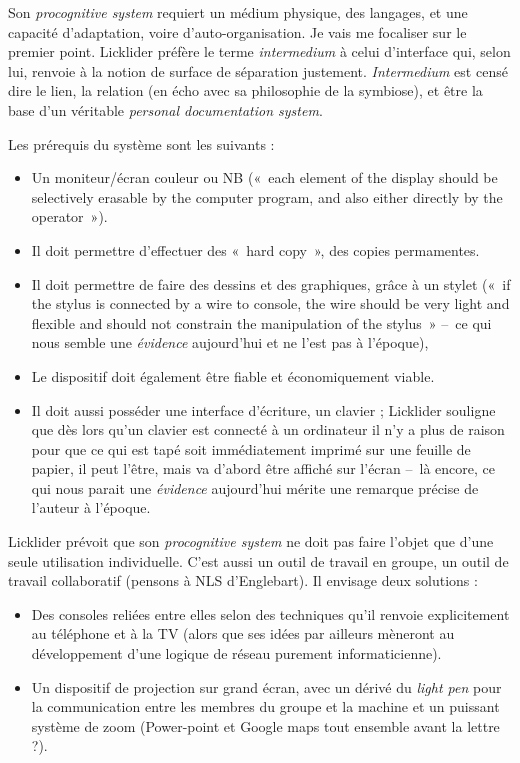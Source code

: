 \documentclass{FramateX}
\begin{document}
\begin{refsection}
Son \textit{procognitive system} requiert un médium physique, des langages, et
une capacité d'adaptation, voire d'auto-organisation. Je vais me
focaliser sur le premier point. Licklider préfère le terme
\textit{intermedium} à celui d'interface qui, selon lui, renvoie à la notion
de surface de séparation justement. \textit{Intermedium} est censé dire le lien,
la relation (en écho avec sa philosophie de la symbiose), et être la
base d'un véritable \textit{personal documentation system}.


Les prérequis du système sont les suivants :

\begin{itemize}
\item Un moniteur/écran couleur ou NB («~each element of the display
should be selectively erasable by the computer program, and also either
directly by the operator~»).
\item Il doit permettre d'effectuer des «~hard copy~», des copies
permamentes.
\item Il doit permettre de faire des dessins et des graphiques, grâce à
un stylet («~if the stylus is connected by a wire to console, the wire
should be very light and flexible and should not constrain the
manipulation of the stylus~» --~ce qui nous semble une \textit{évidence}
aujourd'hui et ne l'est pas à l'époque),
\item Le dispositif doit également être fiable et économiquement viable.
\item Il doit aussi posséder une interface d'écriture, un clavier ; Licklider souligne que dès lors qu'un clavier est connecté à un
ordinateur il n'y a plus de raison pour que ce qui est tapé soit
immédiatement imprimé sur une feuille de papier, il peut l'être, mais
va d'abord être affiché sur l'écran --~là encore, ce qui nous parait une
\textit{évidence} aujourd'hui mérite une remarque précise de l'auteur à
l'époque. 
\end{itemize}

Licklider prévoit que son \textit{procognitive system} ne doit pas faire
l'objet que d'une seule utilisation individuelle. C'est aussi un outil
de travail en groupe, un outil de travail collaboratif (pensons à NLS
d'Englebart). Il envisage deux solutions :

\begin{itemize}
\item Des consoles reliées entre elles selon des techniques qu'il
renvoie explicitement au téléphone et à la TV (alors que ses idées par
ailleurs mèneront au développement d'une logique de réseau purement
informaticienne).
\item Un dispositif de projection sur grand écran, avec un dérivé du
\textit{light pen} pour la communication entre les membres du groupe et la
machine et un puissant système de zoom (Power-point et Google maps tout
ensemble avant la lettre ?).
\end{itemize}



\end{refsection}
\end{document}
